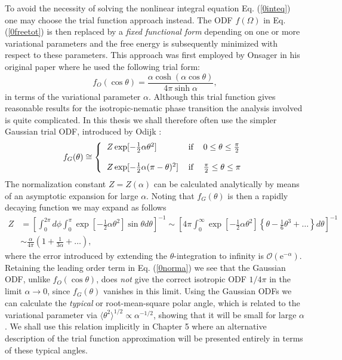 {To avoid the necessity of solving the nonlinear integral equation Eq. (\ref{0inteq}) one may
choose the trial function approach instead. The ODF $f(\Omega)$ in Eq. (\ref{0freetot}) is then
replaced by a {\em fixed functional form}
depending on one or more variational parameters and the free energy is subsequently minimized
with respect to these parameters.
This approach was first employed by Onsager  in his original paper \cite{onsager1949} where he used the following
trial form:
\begin{equation}
f_{O}(\cos \theta) =\frac{\alpha \cosh (\alpha \cos\theta)}{4\pi\sinh \alpha},
\end{equation}
in terms of the variational parameter $\alpha$.
Although this trial function gives reasonable results for the isotropic-nematic
phase transition the analysis involved is
quite complicated.
In this thesis we shall therefore often use the simpler Gaussian trial ODF, introduced
by Odijk \cite{OdijkLekkerkerker}:
\begin{equation}
f_{G}(\theta ) \cong   \left\{
\begin{tabular}{lll}
$Z\exp [-\frac{1}{2}\alpha\theta ^{2}]$ & if & $%
0\leq \theta \leq \frac{\pi }{2}$ \\
&  &  \\
$Z\exp [-\frac{1}{2}\alpha (\pi -\theta )^{2}]$
& if & $\frac{\pi}{2}\leq \theta \leq \pi $%
\end{tabular}
\right.  \label{0ODF}
\end{equation}
The normalization constant $Z=Z(\alpha)$ can be calculated analytically
by means of an asymptotic expansion for large $\alpha$. Noting
that $f_{G}(\theta)$ is then a rapidly decaying function we may expand as follows
\begin{align}
Z&=\left[\int_{0}^{2\pi} d \phi \int _{0}^{\pi} \exp \left[-\frac{1}{2}\alpha\theta ^{2}\right] \sin\theta d\theta\right]^{-1}
\sim \left[ 4\pi \int _{0}^{\infty} \exp \left[-\frac{1}{2}\alpha\theta ^{2}\right]\left\{ \theta - \frac{1}{6} \theta ^{3}+\ldots \right \}
 d\theta  \right]^{-1} \nonumber \\
&\sim \frac{\alpha}{4\pi}\left(1+\frac{1}{3\alpha}+\ldots \right), \label{0norma}
\end{align}
where the error introduced by extending  the $\theta$-integration  to infinity is $\mathcal{O}
(\text{e}^{-\alpha})$. Retaining the leading order term in Eq. (\ref{0norma}) we see that
the Gaussian ODF, unlike $f_{O}(\cos\theta)$,
does {\em not} give the correct isotropic ODF $1/4\pi$ in the limit $\alpha \rightarrow 0$, since $f_{G}(\theta)$
vanishes in this limit. Using the Gaussian ODFs
we can calculate the {\em typical} or root-mean-square polar angle, which is related to the variational parameter
via $\langle\theta^{2}\rangle^{1/2}\propto  \alpha^{-1/2}$, showing that it
will be small for large $\alpha$. We shall  use this relation implicitly in Chapter 5
where  an alternative description of the trial function approximation will be presented
 entirely in terms of these typical angles.


}
